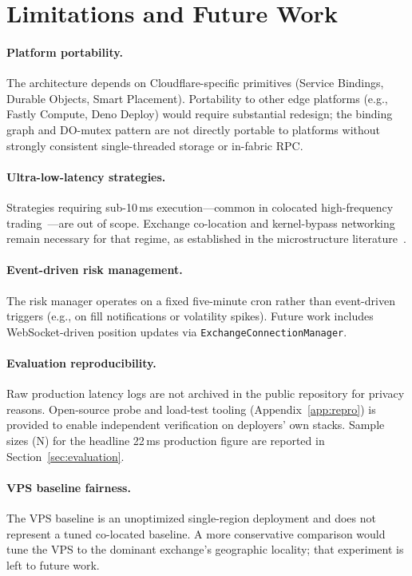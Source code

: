 \section{Limitations and Future Work}
\label{sec:limitations}

\paragraph{Platform portability.} The architecture depends on Cloudflare-specific primitives (Service Bindings, Durable Objects, Smart Placement). Portability to other edge platforms (e.g., Fastly Compute, Deno Deploy) would require substantial redesign; the binding graph and DO-mutex pattern are not directly portable to platforms without strongly consistent single-threaded storage or in-fabric RPC.

\paragraph{Ultra-low-latency strategies.} Strategies requiring sub-10\,ms execution---common in colocated high-frequency trading~\cite{arnold2010latency,budish2015hft}---are out of scope. Exchange co-location and kernel-bypass networking remain necessary for that regime, as established in the microstructure literature~\cite{hasbrouck2013lowlatency}.

\paragraph{Event-driven risk management.} The risk manager operates on a fixed five-minute cron rather than event-driven triggers (e.g., on fill notifications or volatility spikes). Future work includes WebSocket-driven position updates via \texttt{ExchangeConnectionManager}.

\paragraph{Evaluation reproducibility.} Raw production latency logs are not archived in the public repository for privacy reasons. Open-source probe and load-test tooling (Appendix~\ref{app:repro}) is provided to enable independent verification on deployers' own stacks. Sample sizes (N) for the headline 22\,ms production figure are reported in Section~\ref{sec:evaluation}.

\paragraph{VPS baseline fairness.} The VPS baseline is an unoptimized single-region deployment and does not represent a tuned co-located baseline. A more conservative comparison would tune the VPS to the dominant exchange's geographic locality; that experiment is left to future work.

